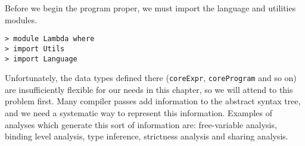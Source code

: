 Before we begin the program proper, we must import the language
and utilities modules.

\begin{verbatim}
> module Lambda where
> import Utils
> import Language
\end{verbatim}
%
%
%
Unfortunately, the data types defined there (\mbox{\tt coreExpr},
\mbox{\tt coreProgram} and so on) are insufficiently flexible for our needs in
this chapter, so we will attend to this problem first.  Many compiler
passes add information to the abstract syntax tree, and we need a
systematic way to represent this information.  Examples of analyses
which generate this sort of information are: free-variable analysis,
binding level analysis, type inference, strictness analysis and
sharing analysis.

